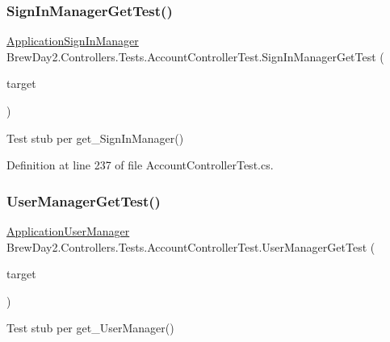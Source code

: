 \subsubsection{\texorpdfstring{Sign\+In\+Manager\+Get\+Test()}{SignInManagerGetTest()}}
{\footnotesize\ttfamily \mbox{\hyperlink{class_brew_day2_1_1_application_sign_in_manager}{Application\+Sign\+In\+Manager}} Brew\+Day2.\+Controllers.\+Tests.\+Account\+Controller\+Test.\+Sign\+In\+Manager\+Get\+Test (\begin{DoxyParamCaption}\item[{\mbox{[}\+Pex\+Assume\+Under\+Test\mbox{]} \mbox{\hyperlink{class_brew_day2_1_1_controllers_1_1_account_controller}{Account\+Controller}}}]{target }\end{DoxyParamCaption})}



Test stub per get\+\_\+\+Sign\+In\+Manager()



Definition at line 237 of file Account\+Controller\+Test.\+cs.

\mbox{\label{class_brew_day2_1_1_controllers_1_1_tests_1_1_account_controller_test_ad0cae168124f66de309444efa89ea958}} 
\subsubsection{\texorpdfstring{User\+Manager\+Get\+Test()}{UserManagerGetTest()}}
{\footnotesize\ttfamily \mbox{\hyperlink{class_brew_day2_1_1_application_user_manager}{Application\+User\+Manager}} Brew\+Day2.\+Controllers.\+Tests.\+Account\+Controller\+Test.\+User\+Manager\+Get\+Test (\begin{DoxyParamCaption}\item[{\mbox{[}\+Pex\+Assume\+Under\+Test\mbox{]} \mbox{\hyperlink{class_brew_day2_1_1_controllers_1_1_account_controller}{Account\+Controller}}}]{target }\end{DoxyParamCaption})}



Test stub per get\+\_\+\+User\+Manager()



